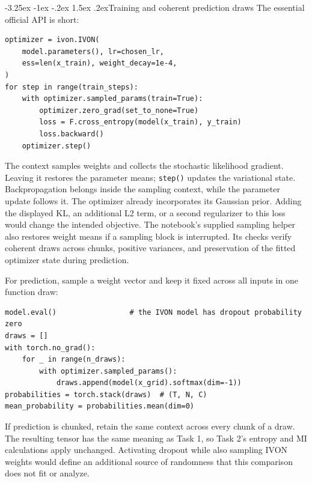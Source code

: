 \documentclass[11pt,a4paper]{article}
\makeatletter
\renewcommand\subsection{\@startsection{subsection}{2}{\z@}%
  {-3.25ex \@plus -1ex \@minus -.2ex}%
  {1.5ex \@plus .2ex}{\normalfont\large}}
\makeatother
\begin{document}
\subsection{Training and coherent prediction draws}
The essential official API is short:
\begin{lstlisting}
optimizer = ivon.IVON(
    model.parameters(), lr=chosen_lr,
    ess=len(x_train), weight_decay=1e-4,
)
for step in range(train_steps):
    with optimizer.sampled_params(train=True):
        optimizer.zero_grad(set_to_none=True)
        loss = F.cross_entropy(model(x_train), y_train)
        loss.backward()
    optimizer.step()
\end{lstlisting}
The context samples weights and collects the stochastic likelihood gradient.
Leaving it restores the parameter means; \texttt{step()} updates the
variational state. Backpropagation belongs inside the sampling context, while
the parameter update follows it. The optimizer already incorporates its
Gaussian prior. Adding the displayed KL, an additional L2 term, or a second
regularizer to this loss would change the intended objective.
The notebook's supplied sampling helper also restores weight means if a
sampling block is interrupted. Its checks verify coherent draws across
chunks, positive variances, and preservation of the fitted optimizer state
during prediction.

For prediction, sample a weight vector and keep it fixed across all inputs
in one function draw:
\begin{lstlisting}
model.eval()                 # the IVON model has dropout probability zero
draws = []
with torch.no_grad():
    for _ in range(n_draws):
        with optimizer.sampled_params():
            draws.append(model(x_grid).softmax(dim=-1))
probabilities = torch.stack(draws)  # (T, N, C)
mean_probability = probabilities.mean(dim=0)
\end{lstlisting}
If prediction is chunked, retain the same context across every chunk of a
draw. The resulting tensor has the same meaning as Task 1, so Task 2's
entropy and MI calculations apply unchanged. Activating dropout while also
sampling IVON weights would define an additional source of randomness that
this comparison does not fit or analyze.
\end{document}
